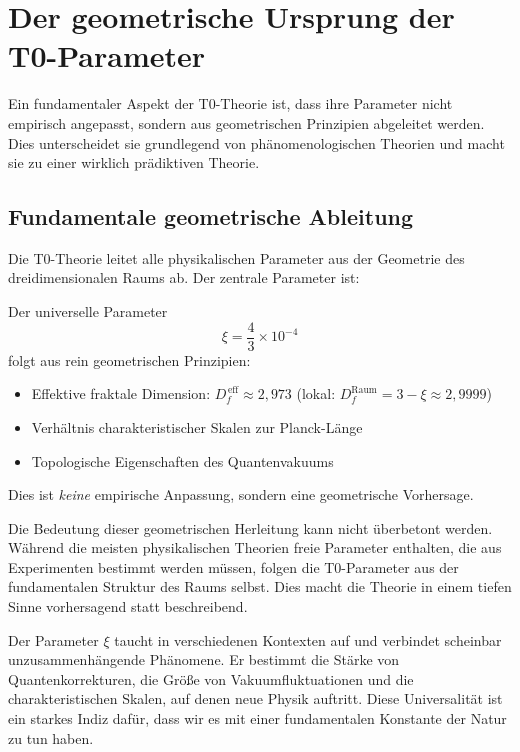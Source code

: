 	\section{Der geometrische Ursprung der T0-Parameter}
	
	Ein fundamentaler Aspekt der T0-Theorie ist, dass ihre Parameter nicht empirisch angepasst, sondern aus geometrischen Prinzipien abgeleitet werden. Dies unterscheidet sie grundlegend von phänomenologischen Theorien und macht sie zu einer wirklich prädiktiven Theorie.
	
	\subsection{Fundamentale geometrische Ableitung}
	
	Die T0-Theorie leitet alle physikalischen Parameter aus der Geometrie des dreidimensionalen Raums ab. Der zentrale Parameter ist:
	
	\begin{tcolorbox}[colback=t0blue!5!white, colframe=t0blue!75!black, title=T0-Vorhersage]
		Der universelle Parameter
		\begin{equation}
			\xi = \frac{4}{3} \times 10^{-4}
		\end{equation}
		folgt aus rein geometrischen Prinzipien:
		\begin{itemize}
			\item Effektive fraktale Dimension: $D_f^{\,\text{eff}} \approx 2{,}973$ (lokal: $D_f^{\text{Raum}} = 3 - \xi \approx 2{,}9999$)
			\item Verhältnis charakteristischer Skalen zur Planck-Länge
			\item Topologische Eigenschaften des Quantenvakuums
		\end{itemize}
		Dies ist \emph{keine} empirische Anpassung, sondern eine geometrische Vorhersage.
	\end{tcolorbox}
	
	Die Bedeutung dieser geometrischen Herleitung kann nicht überbetont werden. Während die meisten physikalischen Theorien freie Parameter enthalten, die aus Experimenten bestimmt werden müssen, folgen die T0-Parameter aus der fundamentalen Struktur des Raums selbst. Dies macht die Theorie in einem tiefen Sinne vorhersagend statt beschreibend.
	
	Der Parameter $\xi$ taucht in verschiedenen Kontexten auf und verbindet scheinbar unzusammenhängende Phänomene. Er bestimmt die Stärke von Quantenkorrekturen, die Größe von Vakuumfluktuationen und die charakteristischen Skalen, auf denen neue Physik auftritt. Diese Universalität ist ein starkes Indiz dafür, dass wir es mit einer fundamentalen Konstante der Natur zu tun haben.
	
